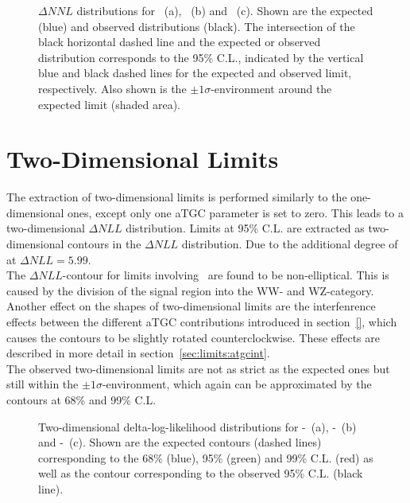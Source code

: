 \begin{figure}
	\centering
	\caption[Delta-log-likelihood distributions for the three aTGC parameters]{$\Delta NNL$ distributions for \Tcwww \ (a), \Tccw \ (b) and \Tcb \ (c). Shown are the expected (blue) and observed distributions (black). The intersection of the black horizontal dashed line and the expected or observed distribution corresponds to the 95\% C.L., indicated by the vertical blue and black dashed lines for the expected and observed limit, respectively. Also shown is the $\pm 1\sigma$-environment around the expected limit (shaded area).}
	\label{fig:limits:1dlimits}
\end{figure}

\section{Two-Dimensional Limits}
\label{sec:2dlims}
The extraction of two-dimensional limits is performed similarly to the one-dimensional ones, except only one aTGC parameter is set to zero. This leads to a two-dimensional $\Delta NLL$ distribution. Limits at 95\% C.L. are extracted as two-dimensional contours in the $\Delta NLL$ distribution. Due to the additional degree of  at $\Delta NLL=5.99$.\\

\noindent The $\Delta NLL$-contour for limits involving \Tcb \ are found to be non-elliptical. This is caused by the division of the signal region into the WW- and WZ-category. Another effect on the shapes of two-dimensional limits are the interfenrence effects between the different aTGC contributions introduced in section~\ref{}, which causes the contours to be slightly rotated counterclockwise. These effects are described in more detail in section~\ref{sec:limits:atgcint}.\\

\noindent The observed two-dimensional limits are not as strict as the expected ones but still within the $\pm 1\sigma$-environment, which again can be approximated by the contours at 68\% and 99\% C.L.
\begin{figure}
	\centering
	\caption[Two-dimensional delta-log-likelihood distributions for the three combinations of aTGC parameters]{Two-dimensional delta-log-likelihood distributions for \Tcwww -\Tccw \ (a), \Tcwww -\Tcb \ (b) and \Tccw -\Tcb\ (c). Shown are the expected contours (dashed lines) corresponding to the 68\% (blue), 95\% (green) and 99\% C.L. (red) as well as the contour corresponding to the observed 95\% C.L. (black line).}
	\label{fig:limits:2dlimits}	
\end{figure}

